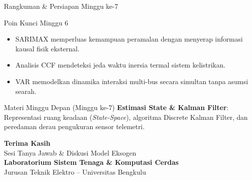 \documentclass[aspectratio=169, 10pt]{beamer}
\begin{document}
\begin{frame}{Rangkuman \& Persiapan Minggu ke-7}
    \begin{block}{Poin Kunci Minggu 6}
        \begin{itemize}
            \item SARIMAX memperluas kemampuan peramalan dengan menyerap informasi kausal fisik eksternal.
            \item Analisis CCF mendeteksi jeda waktu inersia termal sistem kelistrikan.
            \item VAR memodelkan dinamika interaksi multi-bus secara simultan tanpa asumsi searah.
        \end{itemize}
    \end{block}
    \vspace{0.2cm}
    \begin{alertblock}{Materi Minggu Depan (Minggu ke-7)}
        \textbf{Estimasi State \& Kalman Filter}: Representasi ruang keadaan (\textit{State-Space}), algoritma Discrete Kalman Filter, dan peredaman derau pengukuran sensor telemetri.
    \end{alertblock}
\end{frame}

\begin{frame}[plain]
    \begin{center}
        \vspace{1.5cm}
        {\Huge \color{mainblue} \textbf{Terima Kasih}}\\[0.4cm]
        {\large Sesi Tanya Jawab \& Diskusi Model Eksogen}\\[1.2cm]
        \textbf{Laboratorium Sistem Tenaga \& Komputasi Cerdas}\\
        Jurusan Teknik Elektro -- Universitas Bengkulu
    \end{center}
\end{frame}
\end{document}
